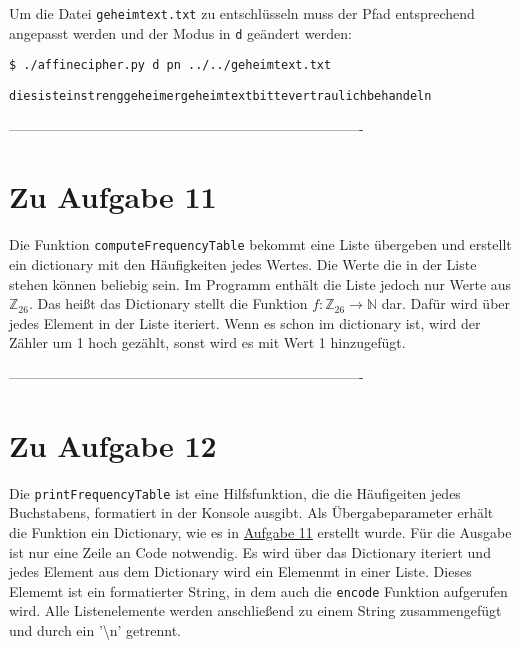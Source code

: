 \documentclass[12pt]{article}
\begin{document}
Um die Datei \texttt{geheimtext.txt} zu entschlüsseln muss der Pfad entsprechend angepasst werden und der Modus in \texttt{d} geändert werden:

\begin{lstlisting}
$ ./affinecipher.py d pn ../../geheimtext.txt
\end{lstlisting}

\begin{lstlisting}
diesisteinstrenggeheimergeheimtextbittevertraulichbehandeln
\end{lstlisting}


%
 ----------------------------------------------------------------------------
\section{Zu Aufgabe 11}
\label{sec:aufgabe_11}

Die Funktion \texttt{computeFrequencyTable} bekommt eine Liste übergeben und erstellt ein dictionary mit den Häufigkeiten jedes Wertes. Die Werte die in der Liste stehen können beliebig sein. Im Programm enthält die Liste jedoch nur Werte aus $\mathbb{Z}_{26}$. Das heißt das Dictionary stellt die Funktion $f: \mathbb{Z}_{26} \to \mathbb{N}$ dar. Dafür wird über jedes Element in der Liste iteriert. Wenn es schon im dictionary ist, wird der Zähler um 1 hoch gezählt, sonst wird es mit Wert 1 hinzugefügt.


%
 ----------------------------------------------------------------------------
\section{Zu Aufgabe 12}

Die \texttt{printFrequencyTable} ist eine Hilfsfunktion, die die Häufigeiten jedes Buchstabens, formatiert in der Konsole ausgibt. Als Übergabeparameter erhält die Funktion ein Dictionary, wie es in \hyperref[sec:aufgabe_11]{Aufgabe 11} erstellt wurde. Für die Ausgabe ist nur eine Zeile an Code notwendig. Es wird über das Dictionary iteriert und jedes Element aus dem Dictionary wird ein Elemenmt in einer Liste. Dieses Elememt ist ein formatierter String, in dem auch die \texttt{encode} Funktion aufgerufen wird. Alle Listenelemente werden anschließend zu einem String zusammengefügt und durch ein '\textbackslash n' getrennt.
\end{document}
